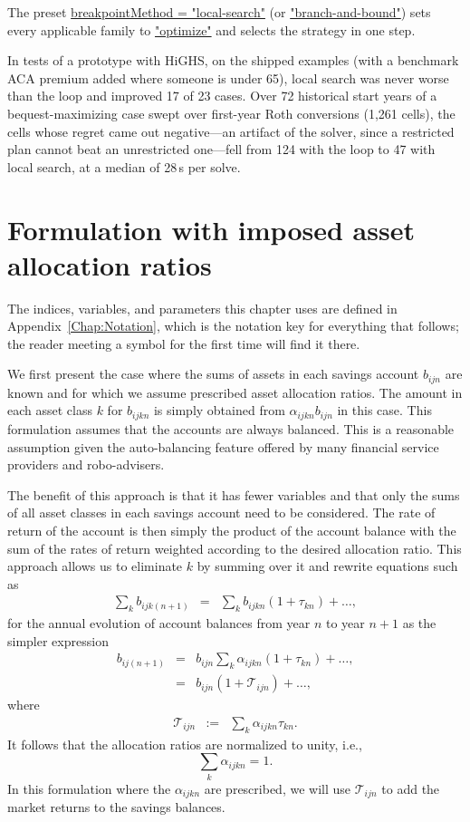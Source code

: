 \documentclass[fleqn,12pt]{report}
\newcommand{\code}[1]{\url{#1}}
\begin{document}
The preset \code{breakpointMethod = "local-search"} (or \code{"branch-and-bound"}) sets every
applicable family to \code{"optimize"} and selects the strategy in one step.

In tests of a prototype with HiGHS, on the shipped examples (with a benchmark ACA premium
added where someone is under 65), local search was never worse than the loop and improved
17 of 23 cases. Over 72 historical start years of a bequest-maximizing case swept over
first-year Roth conversions (1,261 cells), the cells whose regret came out negative---an
artifact of the solver, since a restricted plan cannot beat an unrestricted one---fell from
124 with the loop to 47 with local search, at a median of 28\,s per solve.

\chapter{Formulation with imposed asset allocation ratios}
\label{Chap:Formulation}
The indices, variables, and parameters this chapter uses are defined in
Appendix~\ref{Chap:Notation}, which is the notation key for everything that
follows; the reader meeting a symbol for the first time will find it there.

We first present the case where the sums of assets in each savings account $b_{ijn}$ are known
and for which we assume prescribed asset allocation ratios.
The amount in each asset class $k$ for $b_{ijkn}$ is simply obtained
from $\alpha_{ijkn} b_{ijn}$ in this case.
This formulation assumes that the accounts are always balanced. This is
a reasonable assumption given the auto-balancing feature offered by many financial service
providers and robo-advisers.

The benefit of this approach is that it has fewer variables and that only the sums of
all asset classes in each savings account need to be considered. The rate of return
of the account is then simply the product of the account balance with the sum of
the rates of return weighted according to the desired allocation ratio.
This approach allows us to eliminate $k$ by summing over it and rewrite
equations such as
\begin{eqnarray}
	\sum_k b_{ijk(n+1)} &=& \sum_k b_{ijkn} (1 + \tau_{kn}) + \ldots,
\end{eqnarray}
for the annual evolution of account balances from year $n$ to year $n+1$
as the simpler expression 
\begin{eqnarray}
	b_{ij(n+1)} &=& b_{ijn} \sum_k \alpha_{ijkn} (1 + \tau_{kn}) + \ldots ,\nonumber \\
		  &=& b_{ijn} (1 + \mathcal{T}_{ijn}) + \ldots ,
\end{eqnarray}
where
\begin{eqnarray}
	\label{Eq:Tau1}
	\mathcal{T}_{ijn} &:=& \sum_k \alpha_{ijkn} \tau_{kn}.
\end{eqnarray}
It follows that the allocation ratios are normalized to unity, i.e.,
\begin{equation}
	\label{Eq:AlphaNorm}
	\sum_k \alpha_{ijkn} = 1.
\end{equation}
In this formulation where the $\alpha_{ijkn}$ are prescribed,
we will use $\mathcal{T}_{ijn}$ to
add the market returns to the savings balances.
\end{document}
